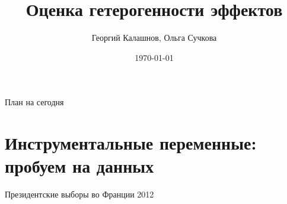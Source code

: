 \title{Оценка гетерогенности эффектов}
\author[Георгий Калашнов, Ольга Сучкова]{Георгий Калашнов, Ольга Сучкова}
\date{\today}



\begin{frame}
  \titlepage
  
\end{frame}


\begin{frame}{План на сегодня} 
\tableofcontents
\end{frame}

\section{Инструментальные переменные: пробуем на данных}

\begin{frame}{Президентские выборы во Франции 2012 \parencite{pons2018will}}
\begin{columns}
\begin{column}{0.5\textwidth} 
    

\end{column}
\end{columns}
\end{frame}

